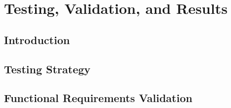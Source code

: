 \chapter{Testing, Validation, and Results}

\section{Introduction}

\section{Testing Strategy}

\section{Functional Requirements Validation}
